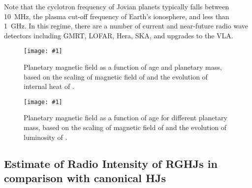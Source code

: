 \documentclass[iop,numberedappendix,apj]{emulateapj}
\def\memoDS#1{\color{blue}$[${\bf #1}$]$ \color{black}}
\def\plotoneh#1{\centering \leavevmode
\texttt{[image: \#1]}}
\begin{document}
Note that the cyclotron frequency of Jovian planets typically falls between 10~MHz, the plasma cut-off frequency of Earth's ionosphere, and less than 1~GHz. 
In this regime, there are a number of current and near-future radio wave detectors including GMRT, 
LOFAR, Hera, SKA, and upgrades to the VLA. 



\begin{figure}[htbp]
   \plotoneh{fig1_linear.pdf}
   \caption{Planetary magnetic field as a function of age and planetary mass, based on the scaling of magnetic field of \citet{christensen2010} and the evolution of internal heat of \citet{burrows_et_al2001}.} %
  \label{fig:planetaryB_pre}
\end{figure}

\begin{figure}[htbp]
   \plotoneh{fig2_Christensen.pdf}
   \caption{Planetary magnetic field as a function of age for different planetary mass, based on the scaling of magnetic field of \citet{christensen2010} and the evolution of luminosity of \citet{burrows_et_al2001}.} %
  \label{fig:planetaryB}
\end{figure}


\subsection{Estimate of Radio Intensity of RGHJs in comparison with canonical HJs}
\label{ss:brightness}
\end{document}
